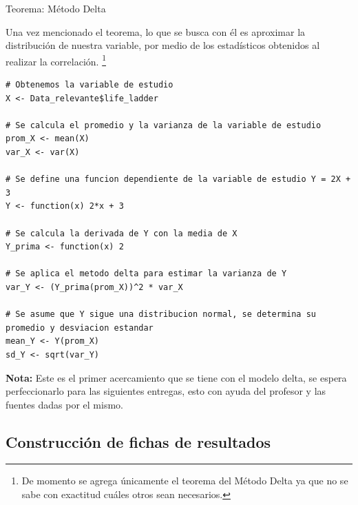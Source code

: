 \begin{enumerate}
\begin{mybox}{Teorema: Método Delta}
        \flushright\cite{asymptotic_stats}
    \end{mybox}

    Una vez mencionado el teorema, lo que se busca con él es aproximar la distribución de nuestra variable, por medio de los estadísticos obtenidos al realizar la correlación. 
    \footnote{De momento se agrega únicamente el teorema del Método Delta ya que no se sabe con exactitud cuáles otros sean necesarios.}

\newpage
\begin{lstlisting}[caption={Estimación de la distribución utilizando el método delta}, label=lst:rchunk2 ] 
# Obtenemos la variable de estudio
X <- Data_relevante$life_ladder

# Se calcula el promedio y la varianza de la variable de estudio
prom_X <- mean(X)
var_X <- var(X)

# Se define una funcion dependiente de la variable de estudio Y = 2X + 3
Y <- function(x) 2*x + 3

# Se calcula la derivada de Y con la media de X
Y_prima <- function(x) 2

# Se aplica el metodo delta para estimar la varianza de Y
var_Y <- (Y_prima(prom_X))^2 * var_X

# Se asume que Y sigue una distribucion normal, se determina su promedio y desviacion estandar
mean_Y <- Y(prom_X)
sd_Y <- sqrt(var_Y)
\end{lstlisting}

\end{enumerate}

\textbf{Nota:} Este es el primer acercamiento que se tiene con el modelo delta, se espera perfeccionarlo para las siguientes entregas, esto con ayuda del profesor y las fuentes dadas por el mismo.

\newpage
\subsection{Construcción de fichas de resultados}

